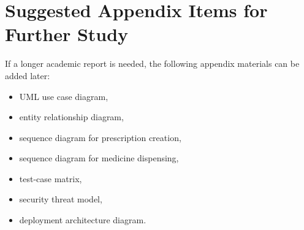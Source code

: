 \documentclass[12pt,a4paper]{article}
\begin{document}
\section{Suggested Appendix Items for Further Study}
If a longer academic report is needed, the following appendix materials can be added later:
\begin{itemize}[leftmargin=*]
  \item UML use case diagram,
  \item entity relationship diagram,
  \item sequence diagram for prescription creation,
  \item sequence diagram for medicine dispensing,
  \item test-case matrix,
  \item security threat model,
  \item deployment architecture diagram.
\end{itemize}
\end{document}

